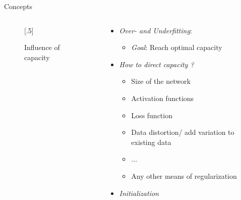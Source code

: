 \documentclass[usenames,dvipsnames,Nike,mathserif]{tuberlinbeamer}
\begin{document}
\begin{frame}[fragile]{Concepts}
	\begin{columns}
		\begin{column}{.5\textwidth}
			\begin{figure}
				\scalebox{.5}[.5]{}
				\caption{Influence of capacity}
			\end{figure}
		\end{column}
		\begin{column}{.5\textwidth}
			\begin{itemize}
				\item \emph{Over- and Underfitting}:
					\begin{itemize}
						\item<2->\emph{Goal}: Reach optimal capacity
					\end{itemize}
				\item<3->\emph{How to direct capacity ?}
				\begin{itemize}
					\item<4-> Size of the network
					\item<5-> Activation functions
					\item<6-> Loss function
					\item<7-> Data distortion/ add variation to existing data
					\item<8-> ...
					\item<8-> Any other means of regularization
				\end{itemize}
				\item<9->\emph{Initialization}
			\end{itemize}
		\end{column}
	\end{columns}
\end{frame}
\end{document}
